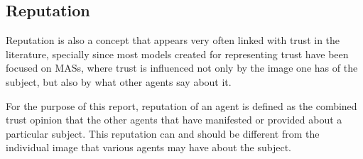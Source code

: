 \subsection{Reputation}
\label{subsec:Reputation}
Reputation is also a concept that appears very often linked with trust in the literature, specially since most models created for representing trust have been focused on \acp{MAS}, where trust is influenced not only by the image one has of the subject, but also by what other agents say about it.

For the purpose of this report, reputation of an agent is defined as the combined trust opinion that the other agents that have manifested or provided about a particular subject. This reputation can and should be different from the individual image that various agents may have about the subject.

